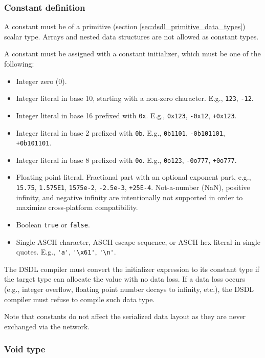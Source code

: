 \subsubsection{Constant definition}\label{sec:dsdl_constant_definition}

A constant must be of a primitive (section \ref{sec:dsdl_primitive_data_types}) scalar type.
Arrays and nested data structures are not allowed as constant types.

A constant must be assigned with a constant initializer, which must be one of the following:

\begin{itemize}
    \item Integer zero (0).
    \item Integer literal in base 10, starting with a non-zero character. E.g., \verb|123|, \verb|-12|.
    \item Integer literal in base 16 prefixed with \verb|0x|. E.g., \verb|0x123|, \verb|-0x12|, \verb|+0x123|.
    \item Integer literal in base 2 prefixed with \verb|0b|. E.g., \verb|0b1101|, \verb|-0b101101|, \verb|+0b101101|.
    \item Integer literal in base 8 prefixed with \verb|0o|. E.g., \verb|0o123|, \verb|-0o777|, \verb|+0o777|.
    \item Floating point literal. Fractional part with an optional exponent part,
          e.g., \verb|15.75|, \verb|1.575E1|, \verb|1575e-2|, \verb|-2.5e-3|, \verb|+25E-4|.
          Not-a-number (NaN), positive infinity, and negative infinity are intentionally not supported
          in order to maximize cross-platform compatibility.
    \item Boolean \verb|true| or \verb|false|.
    \item Single ASCII character, ASCII escape sequence, or ASCII hex literal in single quotes. E.g.,
          \verb|'a'|, \verb|'\x61'|, \verb|'\n'|.
\end{itemize}

The DSDL compiler must convert the initializer expression to its constant type
if the target type can allocate the value with no data loss.
If a data loss occurs (e.g., integer overflow, floating point number decays to infinity, etc.),
the DSDL compiler must refuse to compile such data type.

Note that constants do not affect the serialized data layout as they are never exchanged via the network.

\subsubsection{Void type}

